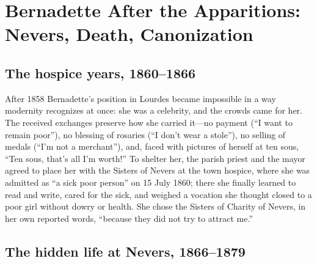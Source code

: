 \section{Bernadette After the Apparitions: Nevers, Death,
Canonization}

\subsection{The hospice years, 1860--1866}

After 1858 Bernadette's position in Lourdes became impossible in a
way modernity recognizes at once: she was a celebrity, and the
crowds came for her. The received exchanges preserve how she
carried it---no payment (``I want to remain poor''), no blessing
of rosaries (``I don't wear a stole''), no selling of medals
(``I'm not a merchant''), and, faced with pictures of herself at
ten sous, ``Ten sous, that's all I'm worth!'' To shelter her, the
parish priest and the mayor agreed to place her with the Sisters
of Nevers at the town hospice, where she was admitted as ``a sick
poor person'' on 15 July 1860; there she finally learned to read
and write, cared for the sick, and weighed a vocation she thought
closed to a poor girl without dowry or health. She chose the
Sisters of Charity of Nevers, in her own reported words,
``because they did not try to attract me.''

\subsection{The hidden life at Nevers, 1866--1879}

